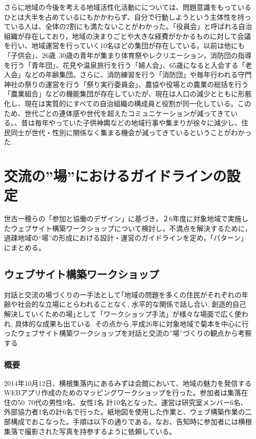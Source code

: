 \documentclass[a4paper]{jsarticle}
\begin{document}
さらに地域の今後を考える地域活性化活動にについては、問題意識をもっているひとは大半を占めているにもかかわらず、自分で行動しようという主体性を持っている人は、全体の2割にも満たないことがわかった。「役員会」と呼ばれる自治組織が存在しており，地域の決まりごとや大きな経費がかかるものに対して会議を行い、地域運営を行っていく10名ほどの集団が存在している。以前は他にも「子供会」、26歳~30歳の青年が集まり体育祭やレクリエーション，消防団の指導を行う「青年団」、花見や温泉旅行を行う「婦人会」、65歳になると入会する「老人会」などの年齢集団。さらに、消防練習を行う「消防団」や毎年行われる守門神社の祭りの運営を行う「祭り実行委員会」、農協や役場との農業の総括を行う「農業組合」などの機能集団が存在していたが、現在は人口の減少とともに形骸化し、現在は実質的にすべての自治組織の構成員と役割が同一化している。このため、世代ごとの連体感や世代を超えたコミュニケーションが減ってきている。、昔は毎年やっていた子供神輿などの地域行事や集まりが徐々に減少し、住民同士が世代・性別に関係なく集まる機会が減ってきているということがわかった.

\newpage
\section{交流の”場”におけるガイドラインの設定}
世古一穂らの「参加と協働のデザイン」\cite{13}に基づき，２6年度に対象地域で実施したウェブサイト構築ワークショップについて検討し，不満点を解決するために，過疎地域の“場”の形成における設計・運営のガイドラインを定め，「パターン」にまとめる。
\subsection{ウェブサイト構築ワークショップ}
対話と交流の場づくりの一手法として｢地域の問題を多くの住民がそれぞれの年齢や社会的な立場にとらわれることなく, 水平的な関係で話し合い, 創造的自己解決していくための場｣\cite{14}として「ワークショップ手法」が様々な場面で広く使われ, 具体的な成果も出ている. その点から,平成26年に対象地域で菊本\cite{15}を中心に行ったウェブサイト構築ワークショップを対話と交流の”場”づくりの観点から考察する.
\subsubsection{概要}
2014年10月12日、横根集落内にあるみずほ会館において、地域の魅力を発信するWEBアプリ作成のためのマッピングワークショップを行った。参加者は集落在住の50~70代の男性9名、女性1名 計10名となった。運営は研究室メンバー6名、外部協力者1名の計6名で行った。紙地図を使用した作業と、ウェブ構築作業の二部構成でおこなった。手順は以下の通りである。なお、告知時に参加者には横根集落で撮影された写真を持参するように依頼している。\\
\end{document}
